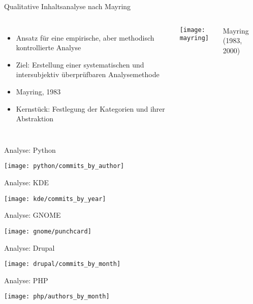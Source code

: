 \documentclass[11pt]{beamer}
\newlength{\colwidth}
\begin{document}
\begin{frame}[t]{Qualitative Inhaltsanalyse nach Mayring}
  \begin{columns}[T]
  \column{\colwidth}
    \begin{itemize}
      \item Ansatz für eine empirische, aber methodisch kontrollierte Analyse
      \item Ziel: Erstellung einer systematischen und intersubjektiv überprüfbaren Analysemethode
      \item Mayring, 1983
      \item Kernstück: Festlegung der Kategorien und ihrer Abstraktion
    \end{itemize}
  \column{\colwidth}
    \texttt{[image: mayring]}

    {\tiny\hfill
    Mayring (1983, 2000)
    }
  \end{columns}
\end{frame}

\begin{frame}{Analyse: Python}
  \begin{center}
    \texttt{[image: python/commits\_by\_author]}
  \end{center}
\end{frame}

\begin{frame}{Analyse: KDE}
  \begin{center}
    \texttt{[image: kde/commits\_by\_year]}
  \end{center}
\end{frame}

\begin{frame}{Analyse: GNOME}
  \begin{center}
    \texttt{[image: gnome/punchcard]}
  \end{center}
\end{frame}

\begin{frame}{Analyse: Drupal}
  \begin{center}
    \texttt{[image: drupal/commits\_by\_month]}
  \end{center}
\end{frame}

\begin{frame}{Analyse: PHP}
  \begin{center}
    \texttt{[image: php/authors\_by\_month]}
  \end{center}
\end{frame}
\end{document}
